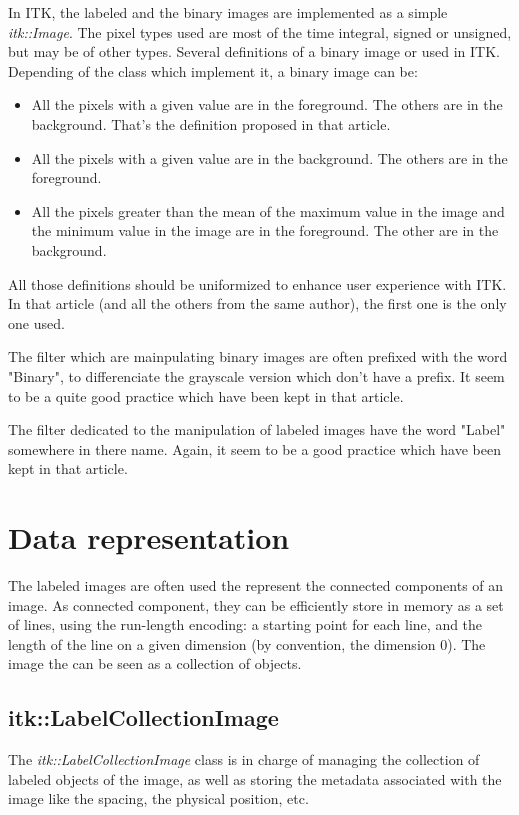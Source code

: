 \documentclass{InsightArticle}
\begin{document}
In ITK, the labeled and the binary images are implemented as a simple {\em itk::Image}. The pixel types used are most of the time integral, signed or unsigned, but may be of other types.
Several definitions of a binary image or used in ITK. Depending of the class which implement it, a binary image can be:
\begin{itemize}
  \item All the pixels with a given value are in the foreground. The others are in the background. That's the definition proposed in that article.
  \item All the pixels with a given value are in the background. The others are in the foreground.
  \item All the pixels greater than the mean of the maximum value in the image and the minimum value in the image are in the foreground. The other are in the background.
\end{itemize}
All those definitions should be uniformized to enhance user experience with ITK. In that article (and all the others from the same author), the first one is the only one used.

The filter which are mainpulating binary images are often prefixed with the word "Binary", to differenciate the grayscale version which don't have a prefix. It seem to be a quite good practice which have been kept in that article.

The filter dedicated to the manipulation of labeled images have the word "Label" somewhere in there name. Again, it seem to be a good practice which have been kept in that article.


\section{Data representation}

The labeled images are often used the represent the connected components of an image. As connected component, they can be efficiently store in memory as a set of lines, using the run-length encoding: a starting point for each line, and the length of the line on a given dimension (by convention, the dimension 0). The image the can be seen as a collection of objects.

\subsection{itk::LabelCollectionImage}

The {\em itk::LabelCollectionImage} class is in charge of managing the collection of labeled
objects of the image, as well as storing the metadata associated with the image like
the spacing, the physical position, etc.
\end{document}
